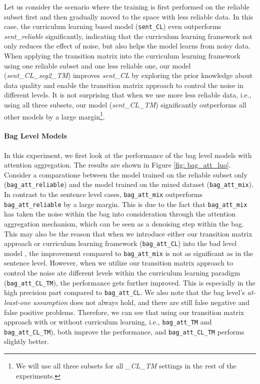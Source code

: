 Let us consider the scenario where the training is first performed on the
reliable subset first and then gradually moved to the space with less
reliable data. In this case, the curriculum learning based model
(\texttt{sent\_CL}) even  outperforms \emph{sent\_reliable} significantly,
indicating that the curriculum learning framework not only reduces the effect
of noise, but also helps the model learns from noisy data. When applying the
transition matrix into the curriculum learning framework using one reliable
subset and one less reliable one,   our model (\emph{sent\_CL\_seg2\_TM})
improves \emph{sent\_CL} by exploring the prior knowledge about data quality
and enable the transition matrix approach to control the noise in different
levels.  It is
not surprising that when we use more less reliable data, i.e., using all
three subsets, our model (\emph{sent\_CL\_TM}) significantly outperforms all
other models by a large margin\footnote{We will use all three subsets for all
\emph{\_CL\_TM} settings in the rest of the experiments.}. 


\paragraph{Bag Level Models}
In this experiment, we first look at the performance of the bag level models with attention aggregation. The results are shown in Figure \ref{fig: bag_att_luo}. 
Consider a comparatione between the  model trained on the reliable subset only (\texttt{bag\_att\_reliable}) and  the model trained on the mixed dataset (\texttt{bag\_att\_mix}). 
In contrast to the sentence level cases, \texttt{bag\_att\_mix} outperforms \texttt{bag\_att\_reliable} by a large margin. This is due to the fact that  \texttt{bag\_att\_mix} has taken the noise within the bag into consideration through the attention aggregation mechanism, which can be seen as a denoising step within the bag.
This may also be the reason that when we introduce either our transition matrix approach   or curriculum learning framework (\texttt{bag\_att\_CL})   into the bad level model , the improvement compared to \texttt{bag\_att\_mix}  is not as significant as in the sentence level.
However, when we utilize our transition matrix approach to control the noise ate different levels within the curriculum learning paradigm (\texttt{bag\_att\_CL\_TM}), the performance gets further improved. This is especially in the high precision part compared to \texttt{bag\_att\_CL}.
We also note that the bag level's  \textit{at-least-one assumption} does not always hold, and there are still false negative and false positive problems. Therefore, we can see that using our transition matrix approach with  or without curriculum learning, i.e.,  \texttt{bag\_att\_TM}  and \texttt{bag\_att\_CL\_TM}), both improve the performance, and \texttt{bag\_att\_CL\_TM} performs slightly better.


